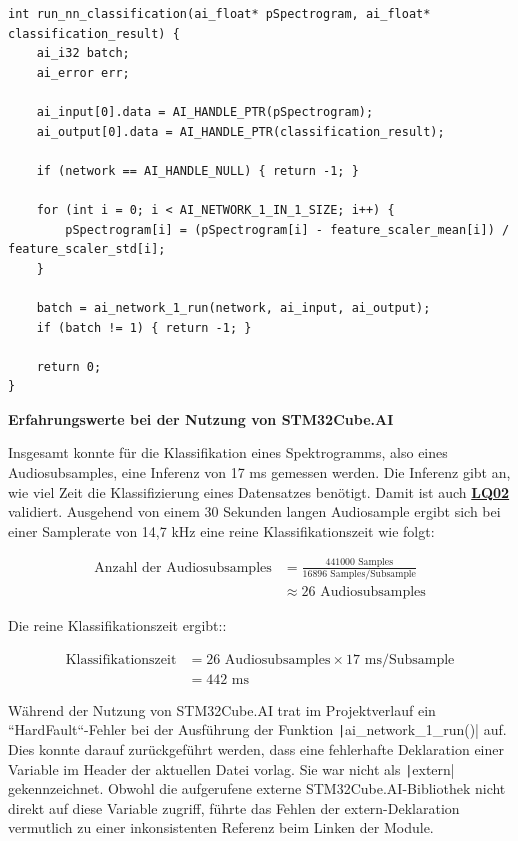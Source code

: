 \begin{verbatim}
int run_nn_classification(ai_float* pSpectrogram, ai_float* classification_result) {
    ai_i32 batch;
    ai_error err;

    ai_input[0].data = AI_HANDLE_PTR(pSpectrogram);
    ai_output[0].data = AI_HANDLE_PTR(classification_result);

    if (network == AI_HANDLE_NULL) { return -1; }

    for (int i = 0; i < AI_NETWORK_1_IN_1_SIZE; i++) {
    	pSpectrogram[i] = (pSpectrogram[i] - feature_scaler_mean[i]) / feature_scaler_std[i];
    }

    batch = ai_network_1_run(network, ai_input, ai_output);
    if (batch != 1) { return -1; }

    return 0;
}
\end{verbatim}

\textbf{Erfahrungswerte bei der Nutzung von STM32Cube.AI}

Insgesamt konnte für die Klassifikation eines Spektrogramms, also eines Audiosubsamples, eine Inferenz von 17 ms gemessen werden. Die Inferenz gibt an, wie viel Zeit die Klassifizierung eines Datensatzes benötigt. Damit ist auch \textbf{\hyperlink{lq-nn-01}{LQ02}} validiert. Ausgehend von einem 30 Sekunden langen Audiosample ergibt sich bei einer Samplerate von 14,7 kHz eine reine Klassifikationszeit wie folgt:


\begin{align*}
\text{Anzahl der Audiosubsamples} &= \frac{441000 \text{ Samples}}{16896 \text{ Samples/Subsample}} \\
&\approx 26 \text{ Audiosubsamples}
\end{align*}

Die reine Klassifikationszeit ergibt::

\begin{align*}
\text{Klassifikationszeit} &= 26 \text{ Audiosubsamples} \times 17 \text{ ms/Subsample} \\
&= 442 \text{ ms}
\end{align*}

Während der Nutzung von STM32Cube.AI trat im Projektverlauf ein ``HardFault``-Fehler bei der Ausführung der Funktion \texttt|ai_network_1_run()| auf. Dies konnte darauf zurückgeführt werden, dass eine fehlerhafte Deklaration einer Variable im Header der aktuellen Datei vorlag. Sie war nicht als \texttt|extern| gekennzeichnet. Obwohl die aufgerufene externe STM32Cube.AI-Bibliothek nicht direkt auf diese Variable zugriff, führte das Fehlen der extern-Deklaration vermutlich zu einer inkonsistenten Referenz beim Linken der Module.

